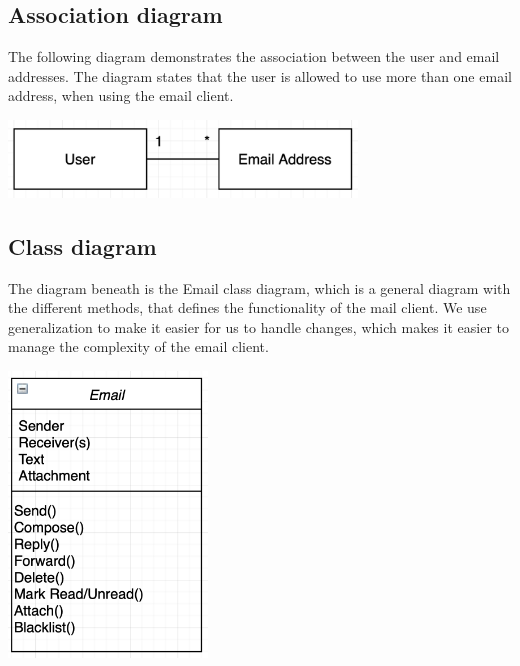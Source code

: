 \documentclass{article}
\begin{document}
\subsection*{Association diagram}
The following diagram demonstrates the association between the user and email addresses. The diagram states that the user is allowed to use more than one email address, when using the email client. 

\begin{center}
\includegraphics[width=350px, keepaspectratio]{UML_Association..png}\\[1cm] 
\end{center} 

\newpage

\subsection*{Class diagram}
The diagram beneath is the Email class diagram, which is a general diagram with the different methods, that defines the functionality of the mail client. We use generalization to make it easier for us to handle changes, which makes it easier to manage the complexity of the email client. 
\vspace{6 mm}

\begin{center}
\includegraphics[width=200px, keepaspectratio]{Class_Diagram.png}\\[1cm]
\end{center}
\end{document}
